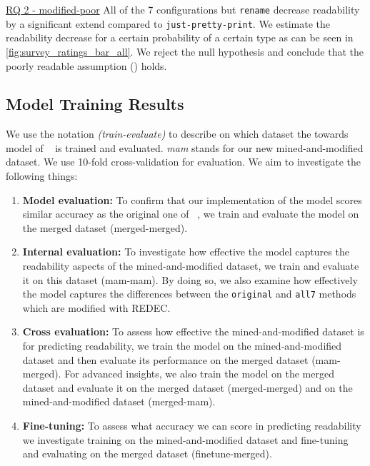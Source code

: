 \documentclass[%
class=scrreprt,
chapterprefix=false,%
open=right,%
twoside=false,%
paper=a4,%
logofile={Logo\_zentral\_farbig\_EN.png},%
thesistype=master,%
UKenglish,%
]{se2thesis}
\theoremstyle{definition}
\newcommand{\rdh}{REDEC\xspace}
\newcommand{\none}{just-pretty-print\xspace} %
\newcommand{\nonet}{\texttt{\none}\xspace} %
\begin{document}
	\begin{summary}{\hyperref[modified-poor]{RQ 2 - modified-poor}}
		All of the 7 configurations but \texttt{rename} decrease readability by a significant extend compared to \nonet. We estimate the readability decrease for a certain probability of a certain type as can be seen in \autoref{fig:survey_ratings_bar_all}. We reject the null hypothesis and conclude that the poorly readable assumption () holds.
	\end{summary}

\subsection{Model Training Results} \label{Model training results}
	We use the notation \textit{(train-evaluate)} to describe on which dataset the towards model of \citeauthor{mi2022towards}~\cite{mi2022towards} is trained and evaluated. \textit{mam} stands for our new mined-and-modified dataset. We use 10-fold cross-validation for evaluation.
	We aim to investigate the following things:
	
	\begin{enumerate}
		\item \textbf{Model evaluation:}
		To confirm that our implementation of the model scores similar accuracy as the original one of \citeauthor{mi2022towards}~\cite{mi2022towards}, we train and evaluate the model on the merged dataset (merged-merged).
		
		\item \textbf{Internal evaluation:} 
		To investigate how effective the model captures the readability aspects of the mined-and-modified dataset, we train and evaluate it on this dataset (mam-mam). By doing so, we also examine how effectively the model captures the differences between the \texttt{original} and \texttt{all7} methods which are modified with \rdh.
		
		\item \textbf{Cross evaluation:} 
		To assess how effective the mined-and-modified dataset is for predicting readability, we train the model on the mined-and-modified dataset and then evaluate its performance on the merged dataset (mam-merged). For advanced insights, we also train the model on the merged dataset and evaluate it on the merged dataset (merged-merged) and on the mined-and-modified dataset (merged-mam).
		
		\item \textbf{Fine-tuning:} 
		To assess what accuracy we can score in predicting readability we investigate training on the mined-and-modified dataset and fine-tuning and evaluating on the merged dataset (finetune-merged).		
		
	\end{enumerate}
	
\end{document}
